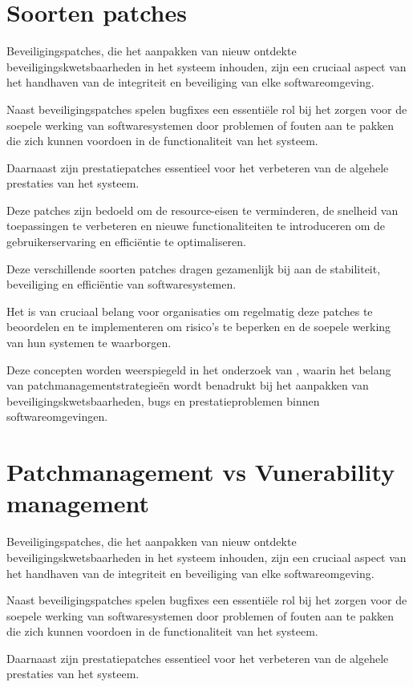 \section{Soorten patches}
Beveiligingspatches, die het aanpakken van nieuw ontdekte beveiligingskwetsbaarheden in het systeem inhouden, zijn een cruciaal aspect van het handhaven van de integriteit en beveiliging van elke softwareomgeving.

 Naast beveiligingspatches spelen bugfixes een essentiële rol bij het zorgen voor de soepele werking van softwaresystemen door problemen of fouten aan te pakken die zich kunnen voordoen in de functionaliteit van het systeem.

 Daarnaast zijn prestatiepatches essentieel voor het verbeteren van de algehele prestaties van het systeem.

 Deze patches zijn bedoeld om de resource-eisen te verminderen, de snelheid van toepassingen te verbeteren en nieuwe functionaliteiten te introduceren om de gebruikerservaring en efficiëntie te optimaliseren.


Deze verschillende soorten patches dragen gezamenlijk bij aan de stabiliteit, beveiliging en efficiëntie van softwaresystemen.

 Het is van cruciaal belang voor organisaties om regelmatig deze patches te beoordelen en te implementeren om risico's te beperken en de soepele werking van hun systemen te waarborgen.


Deze concepten worden weerspiegeld in het onderzoek van \textcite{Wrobel2023}, waarin het belang van patchmanagementstrategieën wordt benadrukt bij het aanpakken van beveiligingskwetsbaarheden, bugs en prestatieproblemen binnen softwareomgevingen.


\section{Patchmanagement vs Vunerability management}
Beveiligingspatches, die het aanpakken van nieuw ontdekte beveiligingskwetsbaarheden in het systeem inhouden, zijn een cruciaal aspect van het handhaven van de integriteit en beveiliging van elke softwareomgeving.

 Naast beveiligingspatches spelen bugfixes een essentiële rol bij het zorgen voor de soepele werking van softwaresystemen door problemen of fouten aan te pakken die zich kunnen voordoen in de functionaliteit van het systeem.

 Daarnaast zijn prestatiepatches essentieel voor het verbeteren van de algehele prestaties van het systeem.

